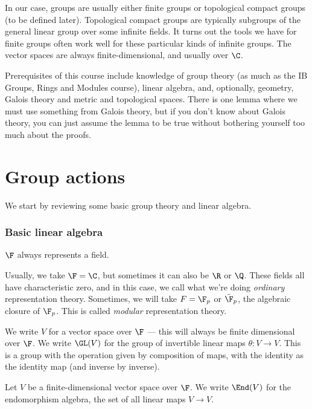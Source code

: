 \documentclass[a4paper]{article}
\begin{document}
In our case, groups are usually either finite groups or topological compact groups (to be defined later). Topological compact groups are typically subgroups of the general linear group over some infinite fields. It turns out the tools we have for finite groups often work well for these particular kinds of infinite groups. The vector spaces are always finite-dimensional, and usually over $\C$.

Prerequisites of this course include knowledge of group theory (as much as the IB Groups, Rings and Modules course), linear algebra, and, optionally, geometry, Galois theory and metric and topological spaces. There is one lemma where we must use something from Galois theory, but if you don't know about Galois theory, you can just assume the lemma to be true without bothering yourself too much about the proofs.

\section{Group actions}
We start by reviewing some basic group theory and linear algebra.

\subsubsection*{Basic linear algebra}
\begin{notation}
  $\F$ always represents a field.
\end{notation}

Usually, we take $\F = \C$, but sometimes it can also be $\R$ or $\Q$. These fields all have characteristic zero, and in this case, we call what we're doing \emph{ordinary} representation theory. Sometimes, we will take $F = \F_p$ or $\bar{\F}_p$, the algebraic closure of $\F_p$. This is called \emph{modular} representation theory.

\begin{notation}
  We write $V$ for a vector space over $\F$ --- this will always be finite dimensional over $\F$. We write $\GL(V)$ for the group of invertible linear maps $\theta: V \to V$. This is a group with the operation given by composition of maps, with the identity as the identity map (and inverse by inverse).
\end{notation}

\begin{notation}
  Let $V$ be a finite-dimensional vector space over $\F$. We write $\End(V)$ for the endomorphism algebra, the set of all linear maps $V \to V$.
\end{notation}
\end{document}
